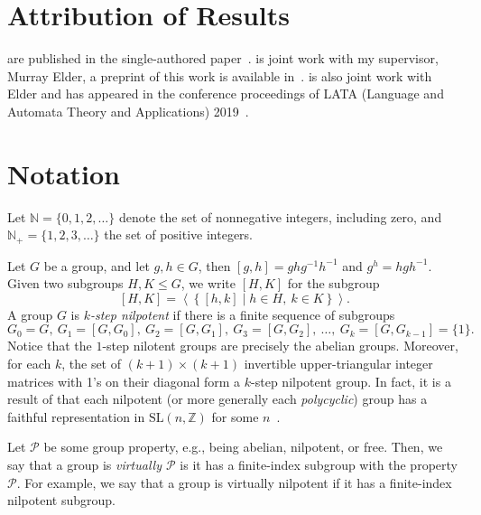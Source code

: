 \section{Attribution of Results}

 are published in the single-authored paper~\cite{bishop2021}.
 is joint work with my supervisor, Murray Elder, a preprint of this work is available in~\cite{bishop2020}.
 is also joint work with Elder and has appeared in the conference proceedings of LATA (Language and Automata Theory and Applications) 2019~\cite{bishop2019}.

\section{Notation}\label{chapter:notation}

Let $\mathbb{N} = \{0,1,2,\ldots\}$ denote the set of nonnegative integers, including zero, and $\mathbb{N}_+ = \{1,2,3,\ldots\}$ the set of positive integers.

Let $G$ be a group, and let $g,h \in G$, then $[g,h] = ghg^{-1}h^{-1}$ and $g^h = h g h^{-1}$.
Given two subgroups $H,K \leqslant G$, we write $[H,K]$ for the subgroup
\[
	[H,K] = \left\langle\left\{ [h,k] \mid h \in H,\ k \in K \right\}\right\rangle.
\]
A group $G$ is \emph{$k$-step nilpotent} if there is a finite sequence of subgroups
\[
	G_0 = G,\ 
	G_1 = [G,G_0],\ 
	G_2 = [G,G_1],\ 
	G_3 = [G,G_2],\ 
	\ldots,\ 
	G_k = [G,G_{k-1}] = \{1\}.
\]
Notice that the $1$-step nilotent groups are precisely the abelian groups.
Moreover, for each $k$, the set of $(k+1) \times (k+1)$ invertible upper-triangular integer matrices with 1's on their diagonal form a $k$-step nilpotent group.
In fact, it is a result of \citeauthor{auslander1967} that each nilpotent (or more generally each \emph{polycyclic}) group has a faithful representation in $\mathrm{SL}(n,\mathbb{Z})$ for some $n$~\cite[Theorem~2]{auslander1967}.

Let $\mathcal{P}$ be some group property, e.g., being abelian, nilpotent, or free.
Then, we say that a group is \emph{virtually $\mathcal{P}$} is it has a finite-index subgroup with the property $\mathcal{P}$.
For example, we say that a group is virtually nilpotent if it has a finite-index nilpotent subgroup.

